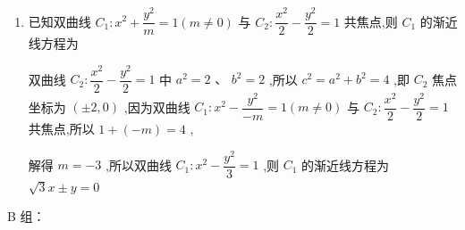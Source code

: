 \begin{enumerate}
\begin{jieda}
        双曲线 $\dfrac{{x}^{2}}{9} - \dfrac{{y}^{2}}{16} = 1$ 的离心率 ${e}_{1} = \sqrt{\dfrac{9 + {16}}{9}} = \dfrac{5}{3}$，而双曲线 $\dfrac{{y}^{2}}{16} - \dfrac{{x}^{2}}{9} = 1$ 的离心率 ${e}_{2} = \sqrt{\dfrac{{16} + 9}{16}} = \dfrac{5}{4}$ ,故 ${D}$ 错误.
    \end{jieda}
    
    \item 已知双曲线 ${C}_{1} : {x}^{2} + \dfrac{{y}^{2}}{m} = 1\left( {m \neq  0}\right)$ 与 ${C}_{2} : \dfrac{{x}^{2}}{2} - \dfrac{{y}^{2}}{2} = 1$ 共焦点,则 ${C}_{1}$ 的渐近线方程为
    \begin{jieda}
        双曲线 ${C}_{2} : \dfrac{{x}^{2}}{2} - \dfrac{{y}^{2}}{2} = 1$ 中 ${a}^{2} = 2\text{ 、 }{b}^{2} = 2$ ,所以 ${c}^{2} = {a}^{2} + {b}^{2} = 4$ ,即 ${C}_{2}$ 焦点坐标为 $\left( {\pm 2,0}\right)$ ,因为双曲线 ${C}_{1} : {x}^{2} - \dfrac{{y}^{2}}{-m} = 1\left( {m \neq  0}\right)$ 与 ${C}_{2} : \dfrac{{x}^{2}}{2} - \dfrac{{y}^{2}}{2} = 1$ 共焦点,所以 $1 + \left( {-m}\right)  = 4$ ,
        
        解得 $m =  - 3$ ,所以双曲线 ${C}_{1} : {x}^{2} - \dfrac{{y}^{2}}{3} = 1$ ,则 ${C}_{1}$ 的渐近线方程为 $\sqrt{3}x \pm  y = 0$
    \end{jieda}

\end{enumerate}
B 组：
